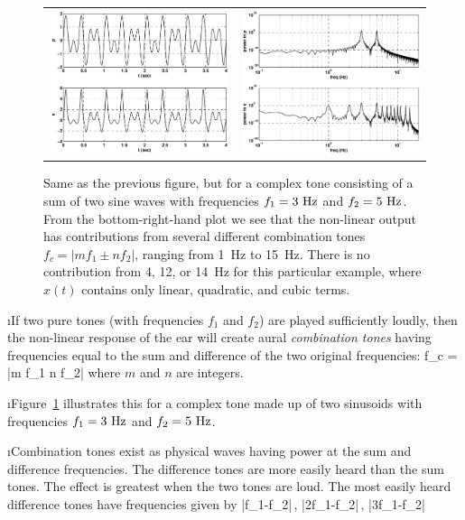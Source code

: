 \begin{figure}[htbp]
\begin{center}
\begin{tabular}{cc}
\includegraphics[width=.45\textwidth]{auralharmonicstime_complex} &
\includegraphics[width=.45\textwidth]{auralharmonicsfreq_complex}
\end{tabular}
\caption{Same as the previous figure, but for a complex
tone consisting of a sum of two sine waves with frequencies
$f_1=3~{\rm Hz}$ and $f_2=5~{\rm Hz}$.
From the bottom-right-hand plot we see that the 
non-linear output has contributions from several different 
combination 
tones $f_c= |mf_1 \pm nf_2|$, ranging from 1~Hz to 15~Hz.
There is no contribution from 4, 12, or 14~Hz for this 
particular example, where $x(t)$ contains only linear, quadratic,
and cubic terms.}
\label{f:auralharmonics-complex}
\end{center}
\end{figure}


\i If two pure tones (with frequencies $f_1$ and
$f_2$) are played sufficiently
loudly, then the non-linear response of the ear
will create aural {\em combination tones} having frequencies
equal to the sum and difference of the two original 
frequencies:
%
\be
f_c = |m f_1 \pm n f_2|
\ee
%
where $m$ and $n$ are integers.

\i Figure~\ref{f:auralharmonics-complex} illustrates 
this for a complex tone made up of two sinusoids with 
frequencies $f_1=3~{\rm Hz}$ and $f_2=5~{\rm Hz}$.

\i Combination tones exist as physical waves
having power at the sum and difference frequencies.
The difference tones are more easily heard 
than  the sum tones.
The effect is greatest when the two tones are loud.
The most easily heard difference tones have
frequencies given by
%
\be
|f_1-f_2|\,,\quad
|2f_1-f_2|\,,\quad
|3f_1-f_2|
\ee

